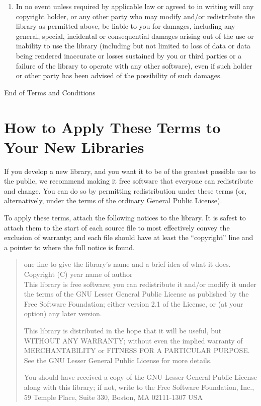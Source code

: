 \documentclass[12pt]{report}
\begin{document}
\begin{enumerate}
\pagebreak[4]

\item

{\sc In no event unless required by applicable law or agreed to in writing
  will any copyright holder, or any other party who may modify and/or
  redistribute the library as permitted above, be liable to you for
  damages, including any general, special, incidental or consequential
  damages arising out of the use or inability to use the library
  (including but not limited to loss of data or data being rendered
  inaccurate or losses sustained by you or third parties or a failure of
  the library to operate with any other software), even if such holder or
  other party has been advised of the possibility of such damages.}

\end{enumerate}

\begin{center}
{\Large\sc End of Terms and Conditions}
\end{center}

\pagebreak[4]

\section*{How to Apply These Terms to Your New Libraries}
           
If you develop a new library, and you want it to be of the greatest
possible use to the public, we recommend making it free software that
everyone can redistribute and change.  You can do so by permitting
redistribution under these terms (or, alternatively, under the terms of
the ordinary General Public License).

To apply these terms, attach the following notices to the library.  It is
safest to attach them to the start of each source file to most effectively
convey the exclusion of warranty; and each file should have at least the
``copyright'' line and a pointer to where the full notice is found.

\begin{quote}
one line to give the library's name and a brief idea of what it does. \\
Copyright (C) year  name of author \\

This library is free software; you can redistribute it and/or modify it
under the terms of the GNU Lesser General Public License as published by
the Free Software Foundation; either version 2.1 of the License, or (at
your option) any later version.

This library is distributed in the hope that it will be useful, but
WITHOUT ANY WARRANTY; without even the implied warranty of MERCHANTABILITY
or FITNESS FOR A PARTICULAR PURPOSE.  See the GNU Lesser General Public
License for more details.

You should have received a copy of the GNU Lesser General Public License
along with this library; if not, write to the Free Software Foundation,
Inc., 59 Temple Place, Suite 330, Boston, MA 02111-1307 USA
\end{quote}
\end{document}
